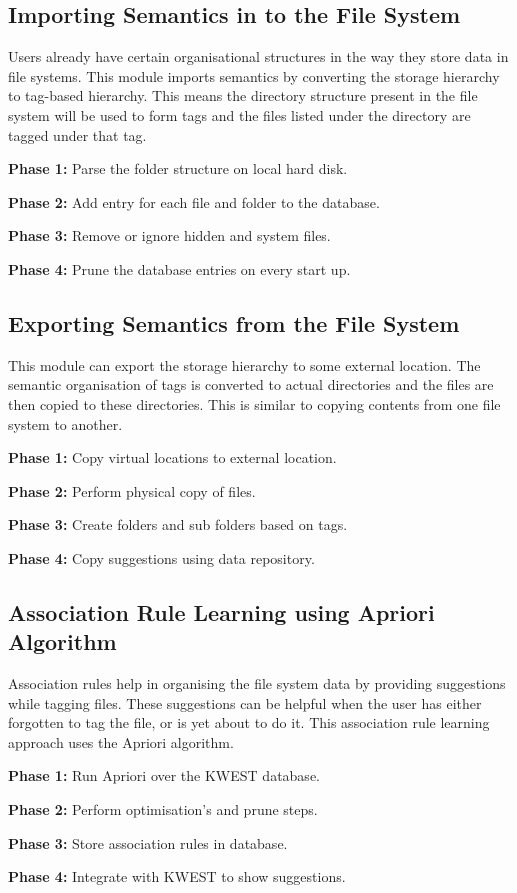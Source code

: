 \subsection{Importing Semantics in to the File System}
Users already have certain organisational structures in the way they store data in file systems. This module imports semantics by converting the storage hierarchy to tag-based hierarchy. This means the directory structure present in the file system will be used to form tags and the files listed under the directory are tagged under that tag.
\begin{list}{•}{•}
\item \textbf{Phase 1:} Parse the folder structure on local hard disk.
\item \textbf{Phase 2:} Add entry for each file and folder to the database.
\item \textbf{Phase 3:} Remove or ignore hidden and system files.
\item \textbf{Phase 4:} Prune the database entries on every start up.
\end{list}

\subsection{Exporting Semantics from the File System}
This module can export the storage hierarchy to some external location. The semantic organisation of tags is converted to actual directories and the files are then copied to these directories. This is similar to copying contents from one file system to another.
\begin{list}{•}{•}
\item \textbf{Phase 1:} Copy virtual locations to external location.
\item \textbf{Phase 2:} Perform physical copy of files.
\item \textbf{Phase 3:} Create folders and sub folders based on tags.
\item \textbf{Phase 4:} Copy suggestions using data repository.
\end{list}

\subsection{Association Rule Learning using Apriori Algorithm}
Association rules help in organising the file system data by providing suggestions while tagging files. These suggestions can be helpful when the user has either forgotten to tag the file, or is yet about to do it. This association rule learning approach uses the Apriori algorithm.
\begin{list}{•}{•}
\item \textbf{Phase 1:} Run Apriori over the KWEST database.
\item \textbf{Phase 2:} Perform optimisation's and prune steps.
\item \textbf{Phase 3:} Store association rules in database.
\item \textbf{Phase 4:} Integrate with KWEST to show suggestions.
\end{list}


